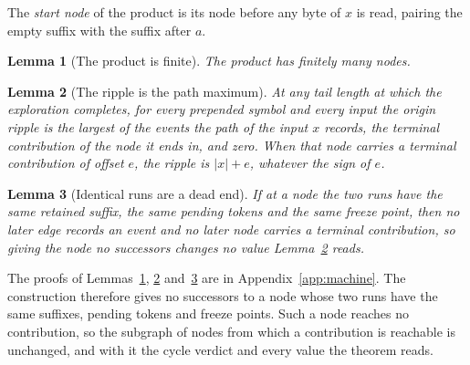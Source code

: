 \documentclass[11pt,a4paper]{article}
\theoremstyle{definition}
\theoremstyle{plain}
\newtheorem{lemma}{Lemma}
\begin{document}
The \emph{start node} of the product is its node before any byte of \(x\) is read, pairing the empty suffix with the
suffix after \(a\).


\begin{lemma}[The product is finite]\label{lem:finite}
The product has finitely many nodes.
\end{lemma}


\begin{lemma}[The ripple is the path maximum]\label{lem:max}
At any tail length at which the exploration completes, for every prepended symbol and every input the origin ripple is
the largest of the events the path of the input \(x\) records, the terminal contribution of the node it ends in, and
zero. When that node carries a terminal contribution of offset \(e\), the ripple is \(|x| + e\), whatever the sign of
\(e\).
\end{lemma}

\begin{lemma}[Identical runs are a dead end]\label{lem:dead}
If at a node the two runs have the same retained suffix, the same pending tokens and the same freeze point, then no
later edge records an event and no later node carries a terminal contribution, so giving the node no successors changes
no value Lemma~\ref{lem:max} reads.
\end{lemma}

The proofs of Lemmas~\ref{lem:finite}, \ref{lem:max} and~\ref{lem:dead} are in Appendix~\ref{app:machine}. The
construction therefore gives no successors to a node whose two runs have the same suffixes, pending tokens and freeze
points. Such a node reaches no contribution, so the subgraph of nodes from which a contribution is reachable is
unchanged, and with it the cycle verdict and every value the theorem reads.
\end{document}
